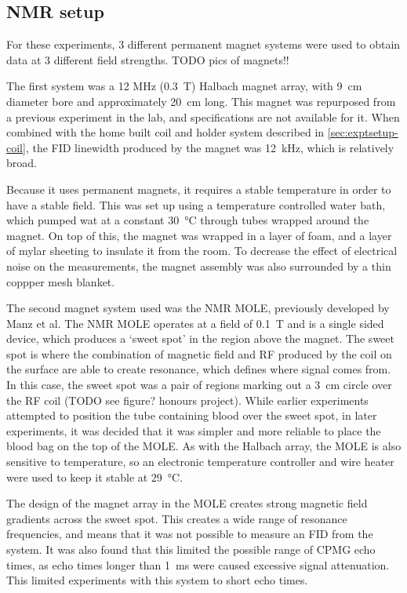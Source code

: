 \subsection{NMR setup}
For these experiments, 3 different permanent magnet systems were used to obtain data at 3 different field strengths.
TODO pics of magnets!!

The first system was a 12 MHz (\SI{0.3}{T}) Halbach magnet array, with \SI{9}{cm} diameter bore and approximately \SI{20}{\centi\metre} long.
This magnet was repurposed from a previous experiment in the lab, and specifications are not available for it.
When combined with the home built coil and holder system described in \autoref{sec:exptsetup-coil}, the FID linewidth produced by the magnet was \SI{12}{\kilo\hertz}, which is relatively broad.

Because it uses permanent magnets, it requires a stable temperature in order to have a stable field.
This was set up using a temperature controlled water bath, which pumped wat at a constant \SI{30}{\celsius} through tubes wrapped around the magnet.
On top of this, the magnet was wrapped in a layer of foam, and a layer of mylar sheeting to insulate it from the room.
To decrease the effect of electrical noise on the measurements, the magnet assembly was also surrounded by a thin coppper mesh blanket.

The second magnet system used was the NMR MOLE, previously developed by Manz et al\cite{ManzmobileonesidedNMR2006}.
The NMR MOLE operates at a field of \SI{0.1}{T} and is a single sided device, which produces a `sweet spot' in the region above the magnet.
The sweet spot is where the combination of magnetic field and RF produced by the coil on the surface are able to create resonance, which defines where signal comes from.
In this case, the sweet spot was a pair of regions marking out a \SI{3}{cm} circle over the RF coil (TODO see figure? honours project).
While earlier experiments attempted to position the tube containing blood over the sweet spot, in later experiments, it was decided that it was simpler and more reliable to place the blood bag on the top of the MOLE.
As with the Halbach array, the MOLE is also sensitive to temperature, so an electronic temperature controller and wire heater were used to keep it stable at \SI{29}{\celsius}.

The design of the magnet array in the MOLE creates strong magnetic field gradients across the sweet spot.
This creates a wide range of resonance frequencies, and means that it was not possible to measure an FID from the system.
It was also found that this limited the possible range of CPMG echo times, as echo times longer than \SI{1}{ms} were caused excessive signal attenuation.
This limited experiments with this system to short echo times.

